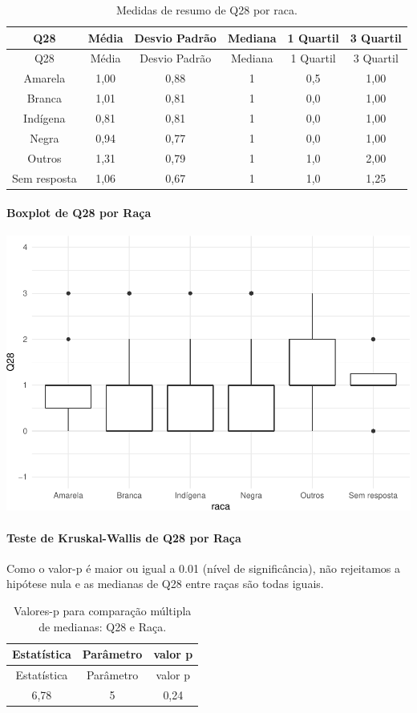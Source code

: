 \documentclass[]{article}
\let\oldparagraph\paragraph
\renewcommand{\paragraph}[1]{\oldparagraph{#1}\mbox{}}
\begin{document}
\begin{longtable}[]{@{}cccccc@{}}
\caption{\label{tab:unnamed-chunk-873}Medidas de resumo de Q28 por raca.}\tabularnewline
\toprule
Q28 & Média & Desvio Padrão & Mediana & 1 Quartil & 3 Quartil\tabularnewline
\midrule
\endfirsthead
\toprule
Q28 & Média & Desvio Padrão & Mediana & 1 Quartil & 3 Quartil\tabularnewline
\midrule
\endhead
Amarela & 1,00 & 0,88 & 1 & 0,5 & 1,00\tabularnewline
Branca & 1,01 & 0,81 & 1 & 0,0 & 1,00\tabularnewline
Indígena & 0,81 & 0,81 & 1 & 0,0 & 1,00\tabularnewline
Negra & 0,94 & 0,77 & 1 & 0,0 & 1,00\tabularnewline
Outros & 1,31 & 0,79 & 1 & 1,0 & 2,00\tabularnewline
Sem resposta & 1,06 & 0,67 & 1 & 1,0 & 1,25\tabularnewline
\bottomrule
\end{longtable}

\hypertarget{boxplot-de-q28-por-rauxe7a}{%
\paragraph{Boxplot de Q28 por Raça}\label{boxplot-de-q28-por-rauxe7a}}

\begin{center}\includegraphics[width=0.75\linewidth]{relatorio_covid19_files/figure-latex/unnamed-chunk-874-1} \end{center}

\hypertarget{teste-de-kruskal-wallis-de-q28-por-rauxe7a}{%
\paragraph{Teste de Kruskal-Wallis de Q28 por Raça}\label{teste-de-kruskal-wallis-de-q28-por-rauxe7a}}

Como o valor-p é maior ou igual a 0.01 (nível de significância), não rejeitamos a hipótese nula e as medianas de Q28 entre raças são todas iguais.

\begin{longtable}[]{@{}ccc@{}}
\caption{\label{tab:unnamed-chunk-876}Valores-p para comparação múltipla de medianas: Q28 e Raça.}\tabularnewline
\toprule
Estatística & Parâmetro & valor p\tabularnewline
\midrule
\endfirsthead
\toprule
Estatística & Parâmetro & valor p\tabularnewline
\midrule
\endhead
6,78 & 5 & 0,24\tabularnewline
\bottomrule
\end{longtable}
\end{document}
